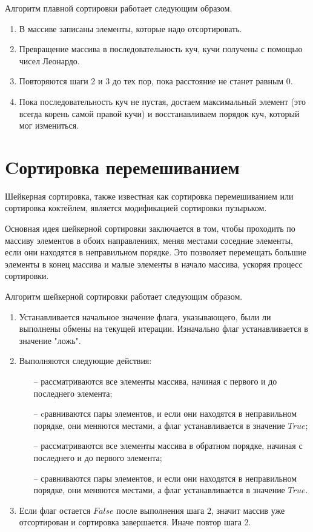 Алгоритм плавной сортировки работает следующим образом.
\begin{enumerate}
\item В массиве записаны элементы, которые надо отсортировать.
\item Превращение массива в последовательность куч, кучи получены с помощью чисел Леонардо.
\item Повторяются шаги 2 и 3 до тех пор, пока расстояние не станет равным 0.
\item Пока последовательность куч не пустая, достаем максимальный элемент (это всегда корень самой правой кучи) и восстанавливаем порядок куч, который мог измениться.
\end{enumerate}




\section{Cортировка перемешиванием}
Шейкерная сортировка, также известная как сортировка перемешиванием или сортировка коктейлем, является модификацией сортировки пузырьком.


Основная идея шейкерной сортировки заключается в том, чтобы проходить по массиву элементов в обоих направлениях, меняя местами соседние элементы, если они находятся в неправильном порядке. Это позволяет перемещать большие элементы в конец массива и малые элементы в начало массива, ускоряя процесс сортировки.


Алгоритм шейкерной сортировки работает следующим образом.
\begin{enumerate}
\item Устанавливается начальное значение флага, указывающего, были ли выполнены обмены на текущей итерации. Изначально флаг устанавливается в значение "ложь".
\item Выполняются следующие действия:
	\begin{itemize}
		\item[--] рассматриваются все элементы массива, начиная с первого и до последнего элемента;
		\item[--] cравниваются пары элементов, и если они находятся в неправильном порядке, они меняются местами, а флаг устанавливается в значение $True$;
		\item[--] рассматриваются все элементы массива в обратном порядке, начиная с последнего и до первого элемента;
		\item[--] сравниваются пары элементов, и если они находятся в неправильном порядке, они меняются местами, а флаг устанавливается в значение $True$.
	\end{itemize}
\item Если флаг остается $False$ после выполнения шага 2, значит массив уже отсортирован и сортировка завершается. Иначе повтор шага 2.
\end{enumerate}

